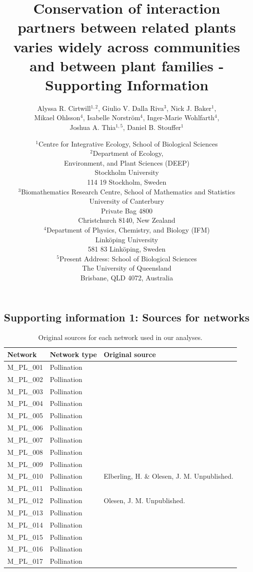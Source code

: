 \documentclass[12pt]{article}
\title{Conservation of interaction partners between related plants varies widely across communities and between plant families - Supporting Information}
\author{Alyssa R. Cirtwill$^{1,2}$, Giulio V. Dalla Riva$^{3}$, Nick J. Baker$^{1}$,\\
Mikael Ohlsson$^{4}$, Isabelle Norstr\"{o}m$^{4}$, Inger-Marie Wohlfarth$^{4}$,\\
Joshua A. Thia$^{1,5}$, 
Daniel B. Stouffer$^{1}$}
\date{\small$^1$Centre for Integrative Ecology, School of Biological Sciences\\
\medskip$^2$Department of Ecology,\\
Environment, and Plant Sciences (DEEP)\\
Stockholm University\\
114 19 Stockholm, Sweden\\
\medskip$^3$Biomathematics Research Centre, School of Mathematics and Statistics\\
University of Canterbury\\Private Bag 4800\\
Christchurch 8140, New Zealand\\
\medskip$^4$Department of Physics, Chemistry, and Biology (IFM)\\ Link\"{o}ping University\\ 581 83 Link\"{o}ping, Sweden\\
\medskip$^5$Present Address: School of Biological Sciences\\
The University of Queensland\\Brisbane, QLD 4072, Australia }
\newcommand{\beginsupplement}{%
        \setcounter{table}{0}
        \renewcommand{\thetable}{S\arabic{table}}%
        \setcounter{figure}{0}
        \renewcommand{\thefigure}{S\arabic{figure}}%
     }
\begin{document}
\maketitle
\baselineskip=8.5mm
\begin{spacing}{1.5}

\linenumbers
\beginsupplement
\clearpage

\section*{Supporting information 1: Sources for networks}
  \begin{table}[!h]
    \caption{Original sources for each network used in our analyses.}
    \label{sources}
    \begin{center}
    \begin{tabular}{|l l m{10cm} |}
    \hline
    Network & Network type & Original source \\
    \hline
    M\_PL\_001  & Pollination & \citep{Arroyo1982}  \\
    M\_PL\_002  & Pollination & \citep{Arroyo1982}  \\
    M\_PL\_003  & Pollination & \citep{Arroyo1982}  \\
    M\_PL\_004  & Pollination & \citep{Barrett1987} \\
    M\_PL\_005  & Pollination & \citep{Clements1923}  \\
    M\_PL\_006  & Pollination & \citep{Dicks2002} \\
    M\_PL\_007  & Pollination & \citep{Dicks2002} \\
    M\_PL\_008  & Pollination & \citep{Dupont2003}  \\
    M\_PL\_009  & Pollination & \citep{Elberling1999} \\
    M\_PL\_010  & Pollination & Elberling, H. \& Olesen, J. M. Unpublished. \\
    M\_PL\_011  & Pollination & \citep{Olesen2002a}  \\
    M\_PL\_012  & Pollination & Olesen, J. M. Unpublished.  \\
    M\_PL\_013  & Pollination & \citep{Ollerton2003}  \\
    M\_PL\_014  & Pollination & \citep{Hocking1968} \\
    M\_PL\_015  & Pollination & \citep{Petanidou1991} \\
    M\_PL\_016  & Pollination & \citep{Herrera1988} \\
    M\_PL\_017  & Pollination & \citep{Memmott2002} \\

\end{tabular}
\end{center}
\end{table}
\end{spacing}
\end{document}
